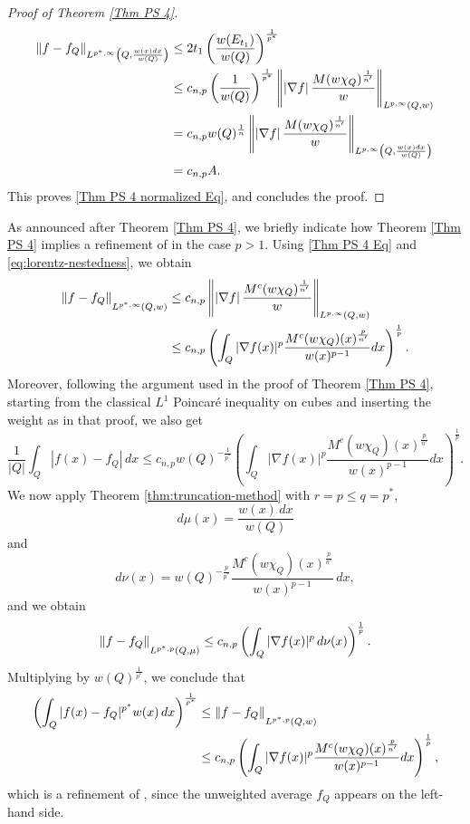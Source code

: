 \documentclass[reqno, 10pt, oneside]{amsart}
\numberwithin{equation}{section}
\newcommand{\strt}[1]{\rule{0pt}{#1}}
\numberwithin{theorem}{section}
\newcommand{\1}{{\rm 1\hspace*{-0.4ex}%
\rule{0.1ex}{1.52ex}\hspace*{0.2ex}}}
\begin{document}
\begin{proof}[Proof of Theorem \ref{Thm PS 4}]
\begin{align*}
    \left\| f-f_Q\right\|_{L^{p^*,\infty}\left(Q,\frac{w(x)dx}{w(Q)}\right)}
    &\le 2t_1 \left(\frac{w(E_{t_1})}{w(Q)}\right)^\frac{1}{p^*} \\
    &\le c_{n,p} \left(\frac{1}{w(Q)}\right)^\frac{1}{p^*} \left\| \left| \nabla f \right| \frac{M(w\chi_Q)^\frac{1}{n'}}{w} \right\|_{\strt{2.3ex} L^{p,\infty}(Q,w)} \\
    &= c_{n,p} w(Q)^\frac{1}{n} \left\| \left| \nabla f \right| \frac{M(w\chi_Q)^\frac{1}{n'}}{w} \right\|_{\strt{2.3ex} L^{p,\infty}\left(Q,\frac{w(x)dx}{w(Q)}\right)} \\
    &= c_{n,p}A.
\end{align*}
This proves \eqref{Thm PS 4 normalized Eq}, and concludes the proof. 
\end{proof}




As announced after Theorem \ref{Thm PS 4}, we briefly indicate how Theorem \ref{Thm PS 4} implies a refinement of \cite[Theorem 1.21]{PR} in the case $p>1$. Using \eqref{Thm PS 4 Eq} and \eqref{eq:lorentz-nestedness}, we obtain
\begin{align*}
    \left\| f-f_Q\right\|_{\strt{2.3ex} L^{p^*,\infty}(Q,w)}
    &\le c_{n,p}\left\| \left| \nabla f \right| \frac{M^c(w\chi_Q)^\frac{1}{n'}}{w}\right\|_{\strt{2.3ex} L^{p,\infty}(Q,w)} \\
    &\le c_{n,p}\left(\int_Q |\nabla f(x)|^p \frac{M^c(w\chi_Q)(x)^\frac{p}{n'}}{w(x)^{p-1}}dx\right)^\frac{1}{p}.
\end{align*}
Moreover, following the argument used in the proof of Theorem \ref{Thm PS 4}, starting from the classical $L^1$ Poincaré inequality on cubes and inserting the weight as in that proof, we also get
\begin{equation*}
    \frac{1}{|Q|}\int_Q |f(x)-f_Q|\,dx
    \le c_{n,p} w(Q)^{-\frac{1}{p^*}}\left(\int_Q |\nabla f(x)|^p \frac{M^c(w\chi_Q)(x)^\frac{p}{n'}}{w(x)^{p-1}}dx\right)^\frac{1}{p}.
\end{equation*}
We now apply Theorem \ref{thm:truncation-method} with $r=p\le q=p^*$,
\begin{equation*}
    d\mu(x)=\frac{w(x)\,dx}{w(Q)}
\end{equation*}
and
\begin{equation*}
    d\nu(x)=w(Q)^{-\frac{p}{p^*}}\frac{M^c(w\chi_Q)(x)^\frac{p}{n'}}{w(x)^{p-1}}\,dx,
\end{equation*}
and we obtain
\begin{equation*}
    \left\| f-f_{Q}\right\|_{\strt{2.3ex} L^{p^*,p}(Q,\mu)}
    \le c_{n,p}\left(\int_Q |\nabla f(x)|^p\,d\nu(x)\right)^\frac{1}{p}.
\end{equation*}
Multiplying by $w(Q)^\frac{1}{p^*}$, we conclude that
\begin{align*}
    \left(\int_Q |f(x)-f_{Q}|^{p^*}w(x)\,dx\right)^\frac{1}{p^*}
    &\le \left\| f-f_{Q}\right\|_{\strt{2.3ex} L^{p^*,p}(Q,w)} \\
    &\le c_{n,p}\left(\int_Q |\nabla f(x)|^p \frac{M^c(w\chi_Q)(x)^\frac{p}{n'}}{w(x)^{p-1}}dx\right)^\frac{1}{p},
\end{align*}
which is a refinement of \cite[Theorem~1.21]{PR}, since the unweighted average $f_Q$ appears on the left-hand side.
\end{document}
